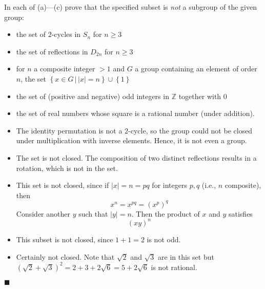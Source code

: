 \documentclass[12pt]{article}
\renewcommand{\qed}{\hfill$\blacksquare$}
\renewenvironment{proof}{\begin{addmargin}[1em]{0em}\begin{newproof}}{\end{newproof}\end{addmargin}\qed}
\newenvironment{problem}[2][Exercise]{\begin{trivlist}
\item[\hskip \labelsep {\bfseries #1}\hskip \labelsep {\bfseries #2.}]}{\end{trivlist}}
\begin{document}
\begin{problem}{2.1.2}
In each of (a)---(c) prove that the specified subset is \textit{not} a subgroup of the given group:
\begin{itemize}
	\item the set of $2$-cycles in $S_n$ for $n\geq 3$
	\item the set of reflections in $D_{2n}$ for $n\geq 3$
	\item for $n$ a composite integer $>1$ and $G$ a group containing an element of order $n$, the set $\left\{x\in G \, | \, \left|x\right|=n\right\}\cup \left\{1\right\}$
	\item the set of (positive and negative) odd integers in $\mathbb{Z}$ together with $0$
	\item the set of real numbers whose square is a rational number (under addition).
\end{itemize}
\end{problem} 
\begin{proof}
\begin{itemize}
	\item The identity permutation is not a $2$-cycle, so the group could not be closed under multiplication with inverse elements. Hence, it is not even a group.
	\item The set is not closed. The composition of two distinct reflections results in a rotation, which is not in the set.
	\item This set is not closed, since if $\left|x\right|=n=pq$ for integers $p,q$ (i.e., $n$ composite), then \[ x^n = x^{pq} = \left(x^p\right)^q \] Consider another $y$ such that $\left|y\right|=n$. Then the product of $x$ and $y$ satisfies \[ \left(xy\right)^n \]
	\item This subset is not closed, since $1+1 = 2$ is not odd.
	\item Certainly not closed. Note that $\sqrt{2}$ and $\sqrt{3}$ are in this set but $\left(\sqrt{2}+\sqrt{3}\right)^2  = 2 + 3 + 2\sqrt{6} = 5+2\sqrt{6}$ is not rational.
\end{itemize}
\end{proof}
\end{document}
